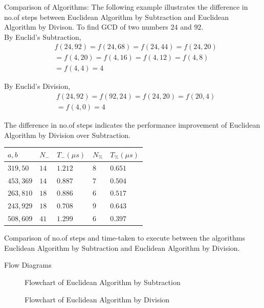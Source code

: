 \documentclass[8pt]{beamer}
\begin{document}
\begin{frame}[allowframebreaks]{Comparison of Algorithms:}
The following example illustrates the difference in no.of steps between Euclidean Algorithm by Subtraction and Euclidean Algorithm by Divison. To find GCD of two numbers $24$ and $92$.\\

By Euclid's Subtraction,
\[
\begin{split}
&f(24,92) = f(24,68) = f(24,44) = f(24,20)\\
&= f(4,20) = f(4,16) = f(4,12) = f(4,8)\\
&= f(4,4) = 4
\end{split}\]

By Euclid's Division,
\[
\begin{split}
&f(24,92) = f(92,24) = f(24,20) = f(20,4)\\
&= f(4,0) = 4
\end{split}\]

The difference in no.of steps indicates the performance improvement of Euclidean Algorithm by Division over Subtraction.

\begin{center}
    \begin{tabular}{ | m{5em} | m{5em} | m{5em} | m{5em} | m{5em} | } 
	\hline
	$a,b$ & $N_{-}$ & $T_{-}(\mu s)$ & $N_{\%}$ & $T_{\%}(\mu s)$ \\ 
	\hline
	$319,50$ & $14$ & $1.212$ & $8$ & $0.651$ \\ 
	\hline
	$453,369$ & $14$ & $0.887$ & $7$ & $0.504$ \\ 
	\hline
	$263,810$ & $18$ & $0.886$ & $6$ & $0.517$ \\ 
	\hline
	$243,929$ & $18$ & $0.708$ & $9$ & $0.643$ \\ 
	\hline
	$508,609$ & $41$ & $1.299$ & $6$ & $0.397$ \\ 
	\hline
    \end{tabular}
\end{center}
Comparison of no.of steps and time-taken to execute between the algorithms Euclidean Algorithm by Subtraction and Euclidean Algorithm by Division. 
\end{frame}

\begin{frame}[allowframebreaks]{Flow Diagrams}
\begin{figure}[h!]
	\begin{center}
		\resizebox{4.25cm}{!}{}
	\end{center}
	\caption{Flowchart of Euclidean Algorithm by Subtraction}
	\label{fig:Input}
\end{figure}
\begin{figure}[h!]
	\begin{center}
		\resizebox{4.25cm}{!}{}
	\end{center}
	\caption{Flowchart of Euclidean Algorithm by Division}
	\label{fig:Input}
\end{figure}
\end{frame}
\end{document}
